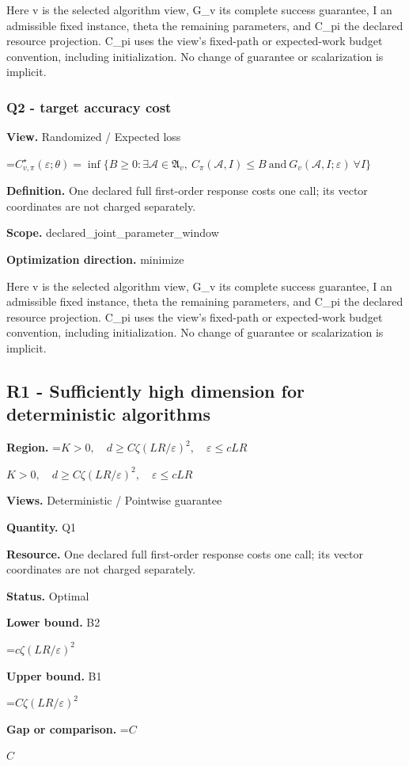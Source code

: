 \documentclass[10pt,a4paper]{article}
\newcommand{\AtlasMath}[1]{\par\begingroup\centering\setbox0=\hbox{$\displaystyle #1$}\ifdim\wd0>1.4\linewidth\typeout{ATLAS WIDE FORMULA: \the\wd0}\fi\ifdim\wd0>\linewidth\resizebox{\linewidth}{!}{\box0}\else\box0\fi\par\endgroup}
\newcommand{\AtlasInlineMath}[1]{\begingroup\setbox0=\hbox{$#1$}\ifdim\wd0>.4\linewidth\endgroup\AtlasMath{#1}\else\endgroup$#1$\fi}
\begin{document}
Here v is the selected algorithm view, G\_v its complete success guarantee, I an admissible fixed instance, theta the remaining parameters, and C\_pi the declared resource projection. C\_pi uses the view's fixed-path or expected-work budget convention, including initialization. No change of guarantee or scalarization is implicit.

\subsubsection{Q2 - target accuracy cost}
\textbf{View.} Randomized / Expected loss

\AtlasMath{C^\star_{v,\pi}(\varepsilon;\theta)=\inf\{B\ge0:\exists\mathcal A\in\mathfrak A_v,\ C_\pi(\mathcal A,I)\le B\ \text{and}\ G_v(\mathcal A,I;\varepsilon)\ \forall I\}}
\textbf{Definition.} One declared full first-order response costs one call; its vector coordinates are not charged separately.

\textbf{Scope.} declared\_joint\_parameter\_window

\textbf{Optimization direction.} minimize

Here v is the selected algorithm view, G\_v its complete success guarantee, I an admissible fixed instance, theta the remaining parameters, and C\_pi the declared resource projection. C\_pi uses the view's fixed-path or expected-work budget convention, including initialization. No change of guarantee or scalarization is implicit.

\subsection{R1 - Sufficiently high dimension for deterministic algorithms}
\textbf{Region.} \AtlasInlineMath{K>0,\quad d\ge C\zeta(LR/\varepsilon)^2,\quad\varepsilon\le cLR}

\textbf{Views.} Deterministic / Pointwise guarantee

\textbf{Quantity.} Q1

\textbf{Resource.} One declared full first-order response costs one call; its vector coordinates are not charged separately.

\textbf{Status.} Optimal

\textbf{Lower bound.} B2

\AtlasMath{c\zeta(LR/\varepsilon)^2}
\textbf{Upper bound.} B1

\AtlasMath{C\zeta(LR/\varepsilon)^2}
\textbf{Gap or comparison.} \AtlasInlineMath{C}
\end{document}
